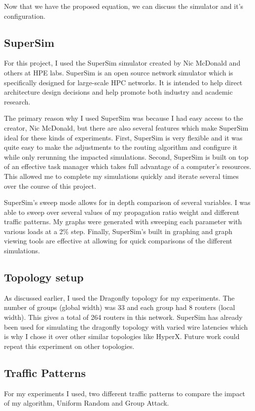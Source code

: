 \documentclass[conference,12pt]{IEEEtran}
\begin{document}
Now that we have the proposed equation, we can discuss the simulator and it's configuration.

\subsection{SuperSim}
For this project, I used the SuperSim simulator created by Nic McDonald and others at HPE labs.\cite{SuperSim} SuperSim is an open source network simulator which is specifically designed for large-scale HPC networks. It is intended to help direct architecture design decisions and help promote both industry and academic research. 

The primary reason why I used SuperSim was because I had easy access to the creator, Nic McDonald, but there are also several features which make SuperSim ideal for these kinds of experiments. First, SuperSim is very flexible and it was quite easy to make the adjustments to the routing algorithm and configure it while only rerunning the impacted simulations. Second, SuperSim is built on top of an effective task manager which takes full advantage of a computer's resources. This allowed me to complete my simulations quickly and iterate several times over the course of this project. 

SuperSim's sweep mode allows for in depth comparison of several variables. I was able to sweep over several values of my propagation ratio weight and different traffic patterns. My graphs were generated with sweeping each parameter with various loads at a 2\% step. Finally, SuperSim's built in graphing and graph viewing tools are effective at allowing for quick comparisons of the different simulations. 

\subsection{Topology setup}
As discussed earlier, I used the Dragonfly topology for my experiments. The number of groups (global width) was 33 and each group had 8 routers (local width). This gives a total of 264 routers in this network. SuperSim has already been used for simulating the dragonfly topology with varied wire latencies which is why I chose it over other similar topologies like HyperX. Future work could repeat this experiment on other topologies.

\subsection{Traffic Patterns}
For my experiments I used, two different traffic patterns to compare the impact of my algorithm, Uniform Random and Group Attack. 
\end{document}
